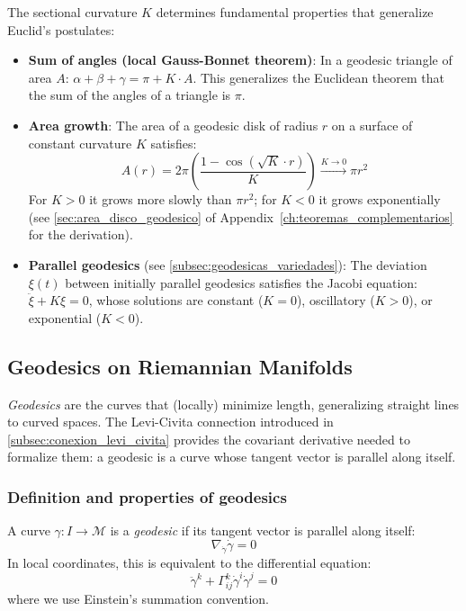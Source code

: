 \begin{remark}\label{rem:significado_curvatura}
The sectional curvature $K$ determines fundamental properties that generalize Euclid's postulates:
\begin{itemize}
    \item \textbf{Sum of angles (local Gauss-Bonnet theorem)}: In a geodesic triangle
          of area $A$: $\alpha + \beta + \gamma = \pi + K \cdot A$. This generalizes the
          Euclidean theorem that the sum of the angles of a triangle is $\pi$.
    \item \textbf{Area growth}: The area of a geodesic disk of radius $r$ on a surface of constant curvature $K$ satisfies:
          \[
          A(r) = 2\pi \left( \frac{1 - \cos(\sqrt{K} \cdot r)}{K} \right) \xrightarrow{K \to 0} \pi r^2
          \]
          For $K > 0$ it grows more slowly than $\pi r^2$; for $K < 0$ it grows exponentially (see \autoref{sec:area_disco_geodesico} of Appendix~\ref{ch:teoremas_complementarios} for the derivation).
    \item \textbf{Parallel geodesics} (see \autoref{subsec:geodesicas_variedades}):
          The deviation $\xi(t)$ between initially parallel geodesics satisfies the
          Jacobi equation: $\ddot{\xi} + K\xi = 0$, whose solutions are constant ($K=0$),
          oscillatory ($K>0$), or exponential ($K<0$).
\end{itemize}
\end{remark}

\subsection{Geodesics on Riemannian Manifolds}\label{subsec:geodesicas_variedades}

\textit{Geodesics} are the curves that (locally) minimize length, generalizing straight lines to curved spaces. The Levi-Civita connection introduced in \autoref{subsec:conexion_levi_civita} provides the covariant derivative needed to formalize them: a geodesic is a curve whose tangent vector is parallel along itself.

\subsubsection{Definition and properties of geodesics}\label{subsec:geodesicas_definicion}

\begin{definition}[Geodesic]\label{def:geodesica}
A curve $\gamma: I \to \mathcal{M}$ is a \textit{geodesic} if its tangent vector is parallel along itself:
\[
\nabla_{\dot{\gamma}} \dot{\gamma} = 0
\]
In local coordinates, this is equivalent to the differential equation:
\[
\ddot{\gamma}^k + \Gamma^k_{ij} \dot{\gamma}^i \dot{\gamma}^j = 0
\]
where we use Einstein's summation convention.
\end{definition}

